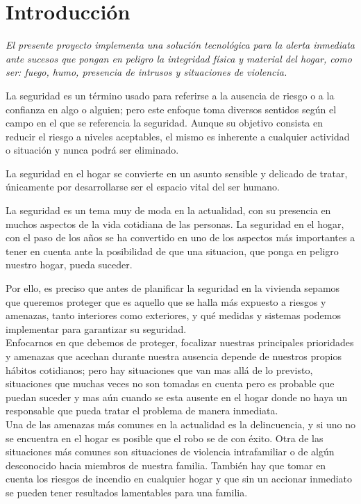 \chapter{Introducción}

\begin{center}
    \textit{
        El presente proyecto implementa una solución tecnológica para la alerta inmediata ante 
        sucesos que pongan en peligro la integridad física y material del hogar, como ser:
        fuego, humo, presencia de intrusos y situaciones de violencia.
    }
\end{center}

La seguridad es un término usado para referirse a la ausencia de riesgo o a la confianza en algo o alguien; pero este
enfoque toma diversos sentidos según el campo en el que se referencia la seguridad. Aunque su objetivo consista
en reducir el riesgo a niveles aceptables, el mismo es inherente a cualquier actividad o situación y nunca podrá ser eliminado.

La seguridad en el hogar se convierte en un asunto sensible y delicado de tratar, únicamente por desarrollarse 
ser el espacio vital 
del ser humano. 

La seguridad es un tema muy de moda en la actualidad, con su presencia en muchos aspectos de
la vida cotidiana de las personas. La seguridad en el hogar, con el paso de los años se ha convertido en 
uno de los aspectos más importantes a tener en cuenta ante la posibilidad de que una situacion, que ponga en 
peligro nuestro hogar, pueda suceder.

Por ello, es preciso que antes de planificar la seguridad en la vivienda sepamos que queremos proteger
que es aquello que se halla más expuesto a riesgos y amenazas, tanto interiores como exteriores, 
y qué medidas y sistemas podemos implementar para garantizar su seguridad. \\

Enfocarnos en que debemos de proteger, focalizar nuestras principales prioridades y amenazas que acechan 
durante nuestra ausencia depende de nuestros propios hábitos cotidianos; pero hay situaciones que van mas
allá de lo previsto, situaciones que muchas veces no son tomadas en cuenta pero es probable que puedan suceder
 y mas aún cuando se esta ausente en el hogar donde no haya un responsable que pueda tratar el problema de manera inmediata.\\

Una de las amenazas más comunes en la actualidad es la delincuencia, y si uno no se encuentra en el hogar es posible que el robo se de con éxito. Otra de las situaciones más comunes son situaciones de violencia intrafamiliar o de algún desconocido hacia miembros de nuestra familia. También hay que tomar en cuenta los riesgos de incendio en cualquier hogar y que sin un accionar inmediato se pueden tener resultados lamentables para una familia.\\

